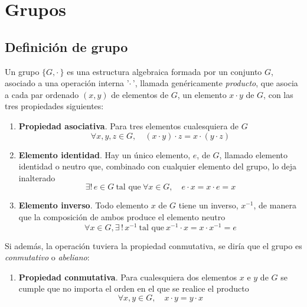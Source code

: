%

\chapter{Grupos}

\section{Definición de grupo}
Un grupo $\{G,\cdot\,\}$ es una estructura algebraica formada por un conjunto $G$,
asociado a una operación interna '$\cdot\,$', llamada genéricamente \emph{producto}, que
asocia a cada par ordenado $(x,y)$ de elementos de $G$, un elemento $x\cdot y$ de $G$,
con las tres propiedades siguientes:
\begin{enumerate}
\item \textbf{Propiedad asociativa}. Para tres elementos cualesquiera de $G$
  \begin{equation}\label{eq:gru-asociativa}
    \forall x, y, z \in G, \quad (x \cdot y) \cdot z = x \cdot (y \cdot z)
  \end{equation}
\item \textbf{Elemento identidad}. Hay un único elemento, $e$, de $G$, llamado elemento
  identidad o neutro que, combinado con cualquier elemento del grupo, lo deja inalterado
  \begin{equation}\label{eq:gru-identidad}
    \exists !\, e \in G \ \text{tal que}\ \forall x \in G, \quad e \cdot x
    = x \cdot e = x
  \end{equation}
\item \textbf{Elemento inverso}. Todo elemento $x$ de $G$ tiene un inverso, $x^{-1}$, de
  manera que la composición de ambos produce el  elemento neutro
  \begin{equation}\label{eq:gru-inverso}
    \forall x \in G, \exists\, !\, x^{-1} \
    \text{tal que}\ x^{-1} \cdot x = x \cdot  x^{-1} = e
  \end{equation}
\end{enumerate}

Si además, la operación tuviera la propiedad conmutativa, se diría que el grupo es
\emph{conmutativo} o \emph{abeliano}:
\begin{enumerate}
\item[4.] \textbf{Propiedad conmutativa}. Para cualesquiera dos elementos $x$ e $y$ de
  $G$ se cumple que no importa el orden en el que se realice el producto
  \begin{equation}\label{eq:gru-conmutativa}
    \forall x,y \in G, \quad x \cdot y = y \cdot x
  \end{equation}
\end{enumerate}

